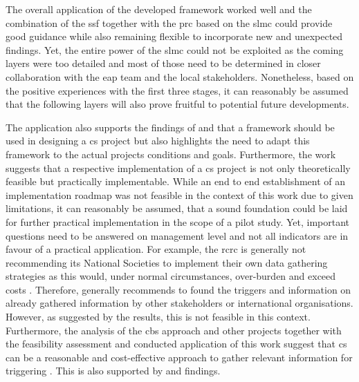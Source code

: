 The overall application of the developed framework worked well and the combination of the \acrshort{ssf} together with the \acrshort{prc} based on the \acrshort{slmc} could provide good guidance while also remaining flexible to incorporate new and unexpected findings. Yet, the entire power of the \acrshort{slmc} could not be exploited as the coming layers were too detailed and most of those need to be determined in closer collaboration with the \acrshort{eap} team and the local stakeholders. Nonetheless, based on the positive experiences with the first three stages, it can reasonably be assumed that the following layers will also prove fruitful to potential future developments.\newline

The application also supports the findings of \autocite{garciaFindingWhatYou2021} and \autocite{conradCommunityBasedMonitoringFrameworks2008} that a framework should be used in designing a \acrshort{cs} project but also highlights the need to adapt this framework to the actual projects conditions and goals. Furthermore, the work suggests that a respective implementation of a \acrlong{cs} project is not only theoretically feasible but practically implementable. While an end to end establishment of an implementation roadmap was not feasible in the context of this work due to given limitations, it can reasonably be assumed, that a sound foundation could be laid for further practical implementation in the scope of a pilot study. Yet, important questions need to be answered on management level and not all indicators are in favour of a practical application. For example, the \acrshort{rcrc} is generally not recommending its National Societies to implement their own data gathering strategies as this would, under normal circumstances, over-burden and exceed costs \autocite{rcrcFORECASTBASEDFINANCINGEARLY2020}. Therefore, \autocite{rcrcFORECASTBASEDFINANCINGEARLY2020} generally recommends to found the triggers and information on already gathered information by other stakeholders or international organisations. However, as suggested by the results, this is not feasible in this context. Furthermore, the analysis of the \acrshort{cbs} approach and other projects together with the feasibility assessment and conducted application of this work suggest that \acrshort{cs} can be a reasonable and cost-effective approach to gather relevant information for triggering . This is also supported by \autocite{aceves-buenoCitizenScienceApproach2015} and \autocite{minkmanCitizenScienceWater2015} findings. 
